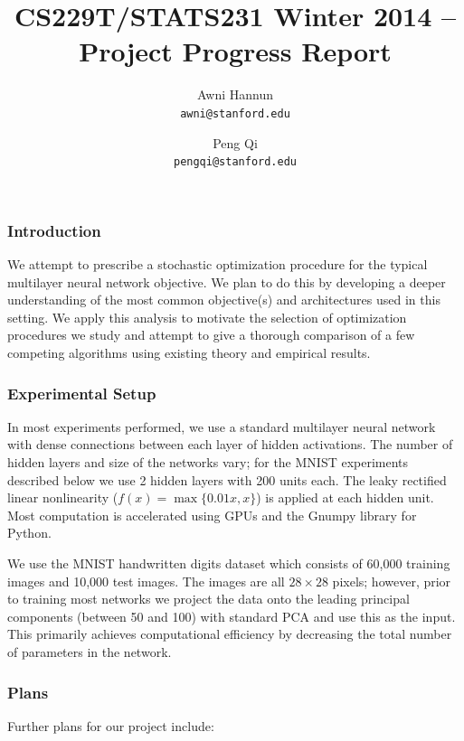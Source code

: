 \documentclass[12pt,english]{article}
\title{
{\large CS229T/STATS231 Winter 2014 -- Project Progress Report }
}
\author{ \large
Awni Hannun \\
\texttt{awni@stanford.edu}
\and
Peng Qi \\
\texttt{pengqi@stanford.edu}
}
\date{}
\newcommand{\1}{\mathbb{I}} %
\begin{document}
\maketitle

\subsubsection*{Introduction}
We attempt to prescribe a stochastic optimization procedure for the typical
multilayer neural network objective. We plan to do this by developing a deeper
understanding of the most common objective(s) and architectures used in this
setting. We apply this analysis to motivate the selection of optimization
procedures we study and attempt to give a thorough comparison of a few
competing algorithms using existing theory and empirical results. 

\subsubsection*{Experimental Setup}

In most experiments performed, we use a standard multilayer neural network with
dense connections between each layer of hidden activations. The number of
hidden layers and size of the networks vary; for the MNIST experiments
described below we use 2 hidden layers with 200 units each. The leaky rectified
linear nonlinearity ($f(x) = \max\{0.01x,x\}$) is applied at each hidden unit.
Most computation is accelerated using GPUs and the Gnumpy library for Python. 

We use the MNIST handwritten digits dataset which consists of 60,000 training
images and 10,000 test images. The images are all $28\times28$ pixels; however,
prior to training most networks we project the data onto the leading principal
components (between 50 and 100) with standard PCA and use this as the input.
This primarily achieves computational efficiency by decreasing the total number
of parameters in the network. 




\subsubsection*{Plans}

Further plans for our project include:
\end{document}
